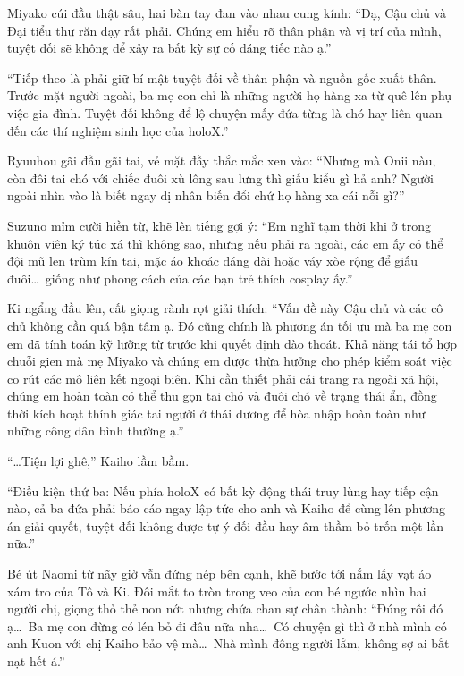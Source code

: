 \documentclass[../main.tex]{subfiles}
\begin{document}
Miyako cúi đầu thật sâu, hai bàn tay đan vào nhau cung kính: ``Dạ, Cậu chủ và Đại tiểu thư răn dạy rất phải. Chúng em hiểu rõ thân phận và vị trí của mình, tuyệt đối sẽ không để xảy ra bất kỳ sự cố đáng tiếc nào ạ.''

``Tiếp theo là phải giữ bí mật tuyệt đối về thân phận và nguồn gốc xuất thân. Trước mặt người ngoài, ba mẹ con chỉ là những người họ hàng xa từ quê lên phụ việc gia đình. Tuyệt đối không để lộ chuyện mấy đứa từng là chó hay liên quan đến các thí nghiệm sinh học của holoX.''

Ryuuhou gãi đầu gãi tai, vẻ mặt đầy thắc mắc xen vào: ``Nhưng mà Onii nàu, còn đôi tai chó với chiếc đuôi xù lông sau lưng thì giấu kiểu gì hả anh? Người ngoài nhìn vào là biết ngay dị nhân biến đổi chứ họ hàng xa cái nỗi gì?''

Suzuno mỉm cười hiền từ, khẽ lên tiếng gợi ý: ``Em nghĩ tạm thời khi ở trong khuôn viên ký túc xá thì không sao, nhưng nếu phải ra ngoài, các em ấy có thể đội mũ len trùm kín tai, mặc áo khoác dáng dài hoặc váy xòe rộng để giấu đuôi\dots\ giống như phong cách của các bạn trẻ thích cosplay ấy.''

Ki ngẩng đầu lên, cất giọng rành rọt giải thích: ``Vấn đề này Cậu chủ và các cô chủ không cần quá bận tâm ạ. Đó cũng chính là phương án tối ưu mà ba mẹ con em đã tính toán kỹ lưỡng từ trước khi quyết định đào thoát. Khả năng tái tổ hợp chuỗi gien mà mẹ Miyako và chúng em được thừa hưởng cho phép kiểm soát việc co rút các mô liên kết ngoại biên. Khi cần thiết phải cải trang ra ngoài xã hội, chúng em hoàn toàn có thể thu gọn tai chó và đuôi chó về trạng thái ẩn, đồng thời kích hoạt thính giác tai người ở thái dương để hòa nhập hoàn toàn như những công dân bình thường ạ.''

``\dots Tiện lợi ghê,'' Kaiho lầm bầm.

``Điều kiện thứ ba: Nếu phía holoX có bất kỳ động thái truy lùng hay tiếp cận nào, cả ba đứa phải báo cáo ngay lập tức cho anh và Kaiho để cùng lên phương án giải quyết, tuyệt đối không được tự ý đối đầu hay âm thầm bỏ trốn một lần nữa.''

Bé út Naomi từ nãy giờ vẫn đứng nép bên cạnh, khẽ bước tới nắm lấy vạt áo xám tro của Tô và Ki. Đôi mắt to tròn trong veo của con bé ngước nhìn hai người chị, giọng thỏ thẻ non nớt nhưng chứa chan sự chân thành: ``Đúng rồi đó ạ\dots\ Ba mẹ con đừng có lén bỏ đi đâu nữa nha\dots\ Có chuyện gì thì ở nhà mình có anh Kuon với chị Kaiho bảo vệ mà\dots\ Nhà mình đông người lắm, không sợ ai bắt nạt hết á.''
\end{document}
